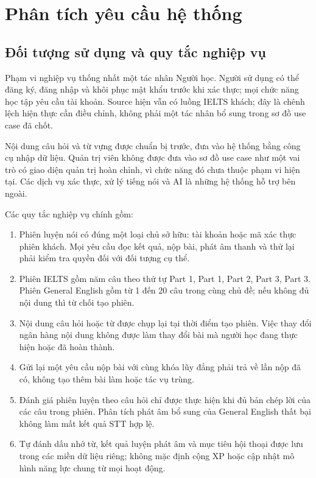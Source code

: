 \documentclass[12pt,a4paper,oneside]{report}
\begin{document}
\section{Phân tích yêu cầu hệ thống}

\subsection{Đối tượng sử dụng và quy tắc nghiệp vụ}

Phạm vi nghiệp vụ thống nhất một tác nhân Người học. Người sử dụng có thể đăng ký, đăng nhập và khôi phục mật khẩu trước khi xác thực; mọi chức năng học tập yêu cầu tài khoản. Source hiện vẫn có luồng IELTS khách; đây là chênh lệch hiện thực cần điều chỉnh, không phải một tác nhân bổ sung trong sơ đồ use case đã chốt.

Nội dung câu hỏi và từ vựng được chuẩn bị trước, đưa vào hệ thống bằng công cụ nhập dữ liệu. Quản trị viên không được đưa vào sơ đồ use case như một vai trò có giao diện quản trị hoàn chỉnh, vì chức năng đó chưa thuộc phạm vi hiện tại. Các dịch vụ xác thực, xử lý tiếng nói và AI là những hệ thống hỗ trợ bên ngoài.

Các quy tắc nghiệp vụ chính gồm:
\begin{enumerate}
    \item Phiên luyện nói có đúng một loại chủ sở hữu: tài khoản hoặc mã xác thực phiên khách. Mọi yêu cầu đọc kết quả, nộp bài, phát âm thanh và thử lại phải kiểm tra quyền đối với đối tượng cụ thể.
    \item Phiên IELTS gồm năm câu theo thứ tự Part 1, Part 1, Part 2, Part 3, Part 3. Phiên General English gồm từ 1 đến 20 câu trong cùng chủ đề; nếu không đủ nội dung thì từ chối tạo phiên.
    \item Nội dung câu hỏi hoặc từ được chụp lại tại thời điểm tạo phiên. Việc thay đổi ngân hàng nội dung không được làm thay đổi bài mà người học đang thực hiện hoặc đã hoàn thành.
    \item Gửi lại một yêu cầu nộp bài với cùng khóa lũy đẳng phải trả về lần nộp đã có, không tạo thêm bài làm hoặc tác vụ trùng.
    \item Đánh giá phiên luyện theo câu hỏi chỉ được thực hiện khi đủ bản chép lời của các câu trong phiên. Phân tích phát âm bổ sung của General English thất bại không làm mất kết quả STT hợp lệ.
    \item Tự đánh dấu nhớ từ, kết quả luyện phát âm và mục tiêu hội thoại được lưu trong các miền dữ liệu riêng; không mặc định cộng XP hoặc cập nhật mô hình năng lực chung từ mọi hoạt động.
\end{enumerate}
\end{document}
